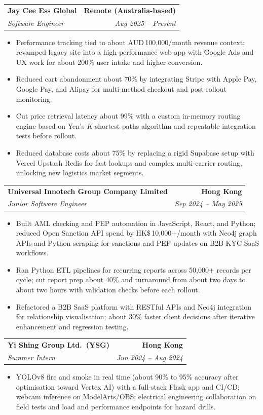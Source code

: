 \documentclass[9pt,a4paper]{article}
\makeatletter
\newcommand{\resumeSubheading}[4]{%
  \vspace{0.6em}%
  \begin{tabular*}{\textwidth}{l@{\extracolsep{\fill}}r}
    \textbf{#1} & \textbf{#2} \\
    \textit{\small #3} & \textit{\small #4} \\
  \end{tabular*}\vspace{0.32em}}
\makeatother
\begin{document}
\resumeSubheading{Jay Cee Ess Global}{Remote (Australia-based)}{Software Engineer}{Aug 2025 -- Present}
\begin{itemize}
  \item Performance tracking tied to about AUD\,100{,}000/month revenue context; revamped legacy site into a high-performance web app with Google Ads and UX work for about 200\% user intake and higher conversion.
  \item Reduced cart abandonment about 70\% by integrating Stripe with Apple Pay, Google Pay, and Alipay for multi-method checkout and post-rollout monitoring.
  \item Cut price retrieval latency about 99\% with a custom in-memory routing engine based on Yen's $K$-shortest paths algorithm and repeatable integration tests before rollout.
  \item Reduced database costs about 75\% by replacing a rigid Supabase setup with Vercel Upstash Redis for fast lookups and complex multi-carrier routing, unlocking new logistics market segments.
\end{itemize}

\resumeSubheading{Universal Innotech Group Company Limited}{Hong Kong}{Junior Software Engineer}{Sep 2024 -- May 2025}
\begin{itemize}
  \item Built AML checking and PEP automation in JavaScript, React, and Python; reduced Open Sanction API spend by HK\$\,10{,}000+/month with Neo4j graph APIs and Python scraping for sanctions and PEP updates on B2B KYC SaaS workflows.
  \item Ran Python ETL pipelines for recurring reports across 50{,}000+ records per cycle; cut report prep about 40\% and turnaround from about two days to about two hours with validation checks before each rollout.
  \item Refactored a B2B SaaS platform with RESTful APIs and Neo4j integration for relationship visualisation; about 30\% faster client decisions after iterative enhancement and regression testing.
\end{itemize}

\resumeSubheading{Yi Shing Group Ltd.\ (YSG)}{Hong Kong}{Summer Intern}{Jun 2024 -- Aug 2024}
\begin{itemize}
  \item YOLOv8 fire and smoke in real time (about 90\% to 95\% accuracy after optimisation toward Vertex AI) with a full-stack Flask app and CI/CD; webcam inference on ModelArts/OBS; electrical engineering collaboration on field tests and load and performance endpoints for hazard drills.
\end{itemize}
\end{document}
